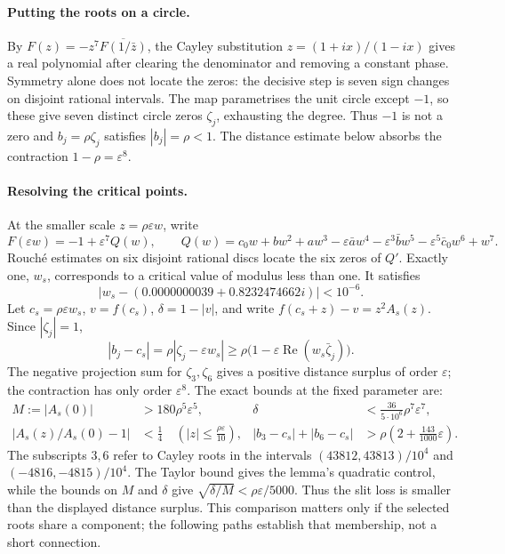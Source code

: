\documentclass[11pt]{article}
\begin{document}
\paragraph{Putting the roots on a circle.}
By $F(z)=-z^7\overline{F(1/\bar z)}$, the Cayley substitution
$z=(1+ix)/(1-ix)$ gives a real polynomial after clearing the denominator
and removing a constant phase. Symmetry alone does not locate the zeros:
the decisive step is seven sign changes on disjoint rational intervals.
The map parametrises the unit circle except $-1$, so these give seven
distinct circle zeros $\zeta_j$, exhausting the degree. Thus $-1$ is
not a zero and $b_j=\rho\zeta_j$ satisfies $|b_j|=\rho<1$.
The distance estimate below absorbs the contraction $1-\rho=\varepsilon^8$.

\paragraph{Resolving the critical points.}
At the smaller scale $z=\rho\varepsilon w$, write
\[
 F(\varepsilon w)=-1+\varepsilon^7Q(w),\qquad
 Q(w)=c_0w+bw^2+aw^3-\varepsilon\bar a w^4
                  -\varepsilon^3\bar b w^5-\varepsilon^5\bar c_0w^6+w^7.
\]
Rouch\'e estimates on six disjoint rational discs locate the six zeros
of $Q'$. Exactly one, $w_s$, corresponds to a critical value of modulus
less than one. It satisfies
\[
 |w_s-(0.0000000039+0.8232474662i)|<10^{-6}.
\]
Let $c_s=\rho\varepsilon w_s$, $v=f(c_s)$, $\delta=1-|v|$, and write
$f(c_s+z)-v=z^2A_s(z)$. Since $|\zeta_j|=1$,
\[
 |b_j-c_s|=\rho|\zeta_j-\varepsilon w_s|
 \ge\rho\bigl(1-\varepsilon\operatorname{Re}(w_s\bar\zeta_j)\bigr).
\]
The negative projection sum for $\zeta_3,\zeta_6$ gives a positive
distance surplus of order $\varepsilon$; the contraction has only
order $\varepsilon^8$. The exact bounds at the fixed parameter are:
\begin{align}
 M:=|A_s(0)|&>180\rho^5\varepsilon^5,&
 \delta&<\frac{36}{5\cdot10^6}\rho^7\varepsilon^7,
       \label{eq:ani-estimates}\\
 \left|A_s(z)/A_s(0)-1\right|&<\frac14
       \quad\left(|z|\le\frac{\rho\varepsilon}{10}\right),&
 |b_3-c_s|+|b_6-c_s|&>
       \rho\left(2+\frac{143}{1000}\varepsilon\right).
       \label{eq:ani-distances}
\end{align}
The subscripts $3,6$ refer to Cayley roots in the intervals
$(43812,43813)/10^4$ and $(-4816,-4815)/10^4$.
The Taylor bound gives the lemma's quadratic control, while the bounds
on $M$ and $\delta$ give $\sqrt{\delta/M}<\rho\varepsilon/5000$.
Thus the slit loss is smaller than the displayed distance surplus.
This comparison matters only if the selected roots share a component;
the following paths establish that membership, not a short connection.
\end{document}
